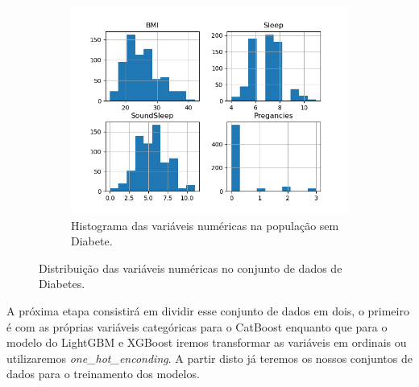 \begin{figure}[H]
     \begin{subfigure}[b]{0.3\textwidth}
 \caption{Histograma das variáveis numéricas na população sem Diabete.}
 \label{fig:var:3:diab}
 \centering
\includegraphics[scale=0.3]{images/hist_diabete_no.png}
     \end{subfigure}
        \caption{Distribuição das variáveis numéricas no conjunto de dados de Diabetes.}
         \label{fig:var:diab:t}
\end{figure}


A próxima etapa consistirá em dividir esse conjunto de dados em dois, o primeiro é com as próprias variáveis categóricas para o CatBoost enquanto que para o modelo do LightGBM e XGBoost iremos transformar as variáveis em ordinais ou utilizaremos \textit{one\_hot\_enconding}. A partir disto já teremos os nossos conjuntos de dados para o treinamento dos modelos.
